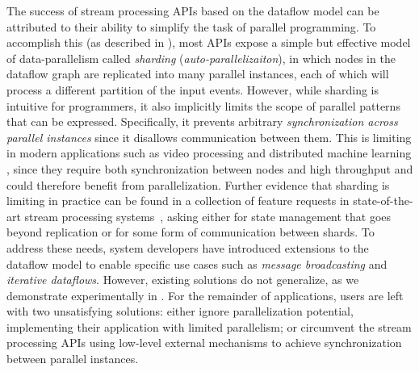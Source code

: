 The success of stream processing APIs based on the dataflow model can be attributed to their ability to simplify the task of parallel programming. To accomplish this (as described in ), most APIs expose a simple but effective model of data-parallelism called \emph{sharding} (\emph{auto-parallelizaiton}), in which
nodes in the dataflow graph are replicated into many parallel instances, each of which
will process a different partition of the input events.
However, while sharding is intuitive for programmers, it also implicitly limits the scope of parallel patterns that
can be expressed. Specifically, it prevents arbitrary
\emph{synchronization across parallel instances}
since it disallows communication between them.
This is limiting in modern applications such as video processing \cite{chienchun2018videoedge} and distributed machine learning \cite{otey2006fast}, since they require both synchronization between nodes and high throughput and could therefore benefit from parallelization.
Further evidence that sharding is limiting in practice
can be found in a collection of feature requests in state-of-the-art stream processing systems~\cite{dgs-feature-request1,dgs-feature-request2,dgs-feature-request3}, asking either for state management that goes beyond replication or for some form of communication between shards.
To address these needs, system developers have introduced
extensions to the dataflow model to enable specific use cases such as  \emph{message broadcasting} and \emph{iterative dataflows}.
However, existing solutions do not generalize,
as we demonstrate experimentally in .
For the remainder of applications, users are left with two unsatisfying solutions: either ignore parallelization potential, implementing their application
with limited parallelism; or circumvent the stream processing APIs using low-level external mechanisms to achieve synchronization between parallel instances.


